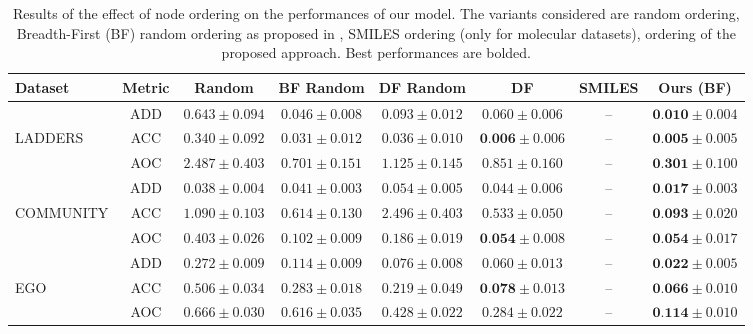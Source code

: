 \begin{table}
    \caption{Results of the effect of node ordering on the performances of our model. The variants considered are random ordering, Breadth-First (BF) random ordering as proposed in \cite{you2018graphrnn}, SMILES ordering (only for molecular datasets), ordering of the proposed approach. Best performances are bolded.}
    \label{tab:graph-ordering-qualitative}
    \renewcommand{\arraystretch}{1.2}
    \begin{tabular}{lccccccc}
        \toprule
         \textbf{Dataset} & \textbf{Metric} & \textbf{Random} & \textbf{BF Random} & \textbf{DF Random} & \textbf{DF} & \textbf{SMILES} & \textbf{Ours (BF)}\\
         \midrule
          & ADD           & $0.643 \pm 0.094$ & $0.046 \pm 0.008$ & $0.093 \pm 0.012$ & $0.060 \pm 0.006$ & --                           & $\textbf{0.010} \pm 0.004$\\
          LADDERS & ACC   & $0.340 \pm 0.092$ & $0.031 \pm 0.012$ & $0.036 \pm 0.010$ & $\textbf{0.006} \pm 0.006$ & --                           & $\textbf{0.005} \pm 0.005$\\
          & AOC           & $2.487 \pm 0.403$ & $0.701 \pm 0.151$ & $1.125 \pm 0.145$ & $0.851 \pm 0.160$ & --                           & $\textbf{0.301} \pm 0.100$\\
         \midrule
          & ADD           & $0.038 \pm 0.004$ & $0.041 \pm 0.003$ & $0.054 \pm 0.005$ & $0.044 \pm 0.006$ & --                           & $\textbf{0.017} \pm 0.003$\\
          COMMUNITY & ACC & $1.090 \pm 0.103$ & $0.614 \pm 0.130$ & $2.496 \pm 0.403$ & $0.533 \pm 0.050$ & --                           & $\textbf{0.093} \pm 0.020$\\
          & AOC           & $0.403 \pm 0.026$ & $0.102 \pm 0.009$ & $0.186 \pm 0.019$ & $\textbf{0.054} \pm 0.008$ & --                           & $\textbf{0.054} \pm 0.017$\\
          \midrule
          & ADD           & $0.272 \pm 0.009$ & $0.114 \pm 0.009$ & $0.076 \pm 0.008$ & $0.060 \pm 0.013$ & --                           & $\textbf{0.022} \pm 0.005$\\
          EGO & ACC       & $0.506 \pm 0.034$ & $0.283 \pm 0.018$ & $0.219 \pm 0.049$ & $\textbf{0.078} \pm 0.013$ & --                           & $\textbf{0.066} \pm 0.010$\\
          & AOC           & $0.666 \pm 0.030$ & $0.616 \pm 0.035$ & $0.428 \pm 0.022$ & $0.284 \pm 0.022$ & --                           & $\textbf{0.114} \pm 0.010$\\

\end{tabular}
\end{table}
